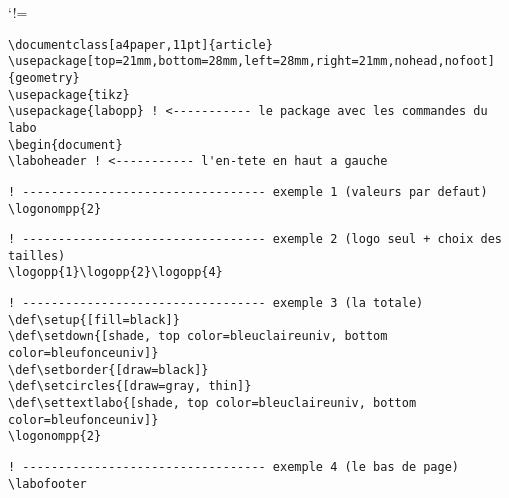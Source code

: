 \documentclass[a4paper,11pt]{article}
\begin{document}
\laboheader

\def\CommentChar{\char37}
\catcode`!=\active
\begin{Verbatim}[defineactive=\def!{\color{orange}\CommentChar}]
\documentclass[a4paper,11pt]{article}
\usepackage[top=21mm,bottom=28mm,left=28mm,right=21mm,nohead,nofoot]{geometry}
\usepackage{tikz}
\usepackage{labopp} ! <----------- le package avec les commandes du labo
\begin{document}
\laboheader ! <----------- l'en-tete en haut a gauche
\end{Verbatim}


\begin{Verbatim}[defineactive=\def!{\color{orange}\CommentChar}]
! ---------------------------------- exemple 1 (valeurs par defaut)
\logonompp{2}
\end{Verbatim}

\begin{Verbatim}[defineactive=\def!{\color{orange}\CommentChar}]
! ---------------------------------- exemple 2 (logo seul + choix des tailles)
\logopp{1}\logopp{2}\logopp{4}
\end{Verbatim}


\begin{Verbatim}[defineactive=\def!{\color{orange}\CommentChar}]
! ---------------------------------- exemple 3 (la totale)
\def\setup{[fill=black]}
\def\setdown{[shade, top color=bleuclaireuniv, bottom color=bleufonceuniv]}
\def\setborder{[draw=black]}
\def\setcircles{[draw=gray, thin]}
\def\settextlabo{[shade, top color=bleuclaireuniv, bottom color=bleufonceuniv]}
\logonompp{2}
\end{Verbatim}
\def\setup{[fill=black]}
\def\setdown{[shade, top color=bleuclaireuniv, bottom color=bleufonceuniv]}
\def\setborder{[draw=black]}
\def\setcircles{[draw=gray, thin]}
\def\settextlabo{[shade, top color=bleuclaireuniv, bottom color=bleufonceuniv]}



\vfill

\begin{Verbatim}[defineactive=\def!{\color{orange}\CommentChar}]
! ---------------------------------- exemple 4 (le bas de page)
\labofooter
\end{Verbatim}
\labofooter

\pagebreak
\end{document}

